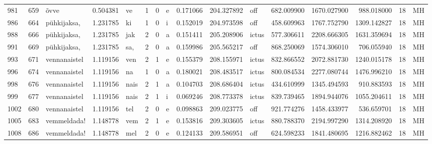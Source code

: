 \begin{tabular}{lrlrllllrrlrrrll}
981  &         659 &             õvve &  0.504381 &      ve &        1 &      0 &       e &      0.171066 &    204.327892 &    off &   682.009900 &  1670.027900 &   988.018000 &     18 &        MH \\
986  &         664 &      pühkijaksa, &  1.231785 &      ki &        1 &      0 &       i &      0.152019 &    204.973598 &    off &   458.609963 &  1767.752790 &  1309.142827 &     18 &        MH \\
988  &         666 &      pühkijaksa, &  1.231785 &     jak &        2 &      0 &       a &      0.151411 &    205.208906 &  ictus &   577.306611 &  2208.666305 &  1631.359694 &     18 &        MH \\
991  &         669 &      pühkijaksa, &  1.231785 &     sa, &        2 &      0 &       a &      0.159986 &    205.565217 &    off &   868.250069 &  1574.306010 &   706.055940 &     18 &        MH \\
993  &         671 &     vennanaistel &  1.119156 &     ven &        2 &      1 &       e &      0.155379 &    208.155971 &  ictus &   832.866552 &  2072.881730 &  1240.015178 &     18 &        MH \\
996  &         674 &     vennanaistel &  1.119156 &      na &        1 &      0 &       a &      0.180021 &    208.483517 &  ictus &   800.084534 &  2277.080744 &  1476.996210 &     18 &        MH \\
998  &         676 &     vennanaistel &  1.119156 &    nais &        2 &      1 &       a &      0.104703 &    208.686404 &  ictus &   434.610999 &  1345.494593 &   910.883593 &     18 &        MH \\
999  &         677 &     vennanaistel &  1.119156 &    nais &        2 &      1 &       i &      0.069246 &    208.773378 &  ictus &   839.739465 &  1894.944076 &  1055.204611 &     18 &        MH \\
1002 &         680 &     vennanaistel &  1.119156 &     tel &        2 &      0 &       e &      0.098863 &    209.023775 &    off &   921.774276 &  1458.433977 &   536.659701 &     18 &        MH \\
1005 &         683 &      vemmeldada! &  1.148778 &     vem &        2 &      1 &       e &      0.153816 &    209.303605 &  ictus &   880.788370 &  2194.997290 &  1314.208920 &     18 &        MH \\
1008 &         686 &      vemmeldada! &  1.148778 &     mel &        2 &      0 &       e &      0.124133 &    209.586951 &    off &   624.598233 &  1841.480695 &  1216.882462 &     18 &        MH \\

\end{tabular}
